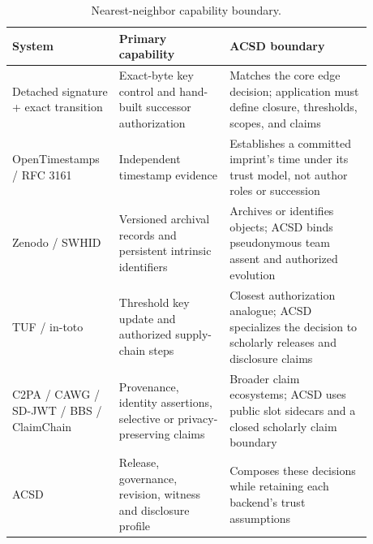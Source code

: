 \documentclass[acmsmall,screen,review,nonacm]{acmart}
\begin{document}
\begin{table}[h]
\centering
\caption{Nearest-neighbor capability boundary.}
\label{tab:capability-boundary}
\begin{tabular}{p{0.23\linewidth}p{0.29\linewidth}p{0.36\linewidth}}
\toprule
System & Primary capability & ACSD boundary \\
\midrule
Detached signature + exact transition & Exact-byte key control and hand-built successor authorization & Matches the core edge decision; application must define closure, thresholds, scopes, and claims \\
OpenTimestamps / RFC 3161 & Independent timestamp evidence & Establishes a committed imprint's time under its trust model, not author roles or succession \\
Zenodo / SWHID & Versioned archival records and persistent intrinsic identifiers & Archives or identifies objects; ACSD binds pseudonymous team assent and authorized evolution \\
TUF / in-toto & Threshold key update and authorized supply-chain steps & Closest authorization analogue; ACSD specializes the decision to scholarly releases and disclosure claims \\
C2PA / CAWG / SD-JWT / BBS / ClaimChain & Provenance, identity assertions, selective or privacy-preserving claims & Broader claim ecosystems; ACSD uses public slot sidecars and a closed scholarly claim boundary \\
ACSD & Release, governance, revision, witness and disclosure profile & Composes these decisions while retaining each backend's trust assumptions \\
\bottomrule
\end{tabular}
\end{table}
\end{document}
